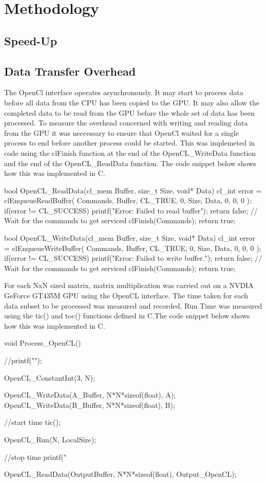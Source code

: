 \section{Methodology}

\subsection{Speed-Up}

\subsection{Data Transfer Overhead}
The OpenCl interface operates asynchronously. It may start to process data before all data from the CPU has been copied to the GPU. It may also allow the completed data to be read from the GPU before the whole set of data has been processed. To measure the overhead concerned with writing and reading data from the GPU it was neccessary to ensure that OpenCl waited for a single process to end before another process could be started. This was implemeted in code using the clFinish function at the end of the OpenCL\_WriteData function and the end of the OpenCL\_ReadData function. The code snippet below shows how this was implemented in C.

\begin{Cpp}
bool OpenCL_ReadData(cl_mem Buffer, size_t Size, void* Data){
	cl_int error = clEnqueueReadBuffer(
	Commands,
	Buffer,
	CL_TRUE,
	0,
	Size,
	Data,
	0, 0, 0
	);
	if(error != CL_SUCCESS){
		printf("Error: Failed to read buffer\n");
		return false;
	}
	// Wait for the commands to get serviced
	clFinish(Commands);
	return true;
}

bool OpenCL_WriteData(cl_mem Buffer, size_t Size, void* Data){
	cl_int error = clEnqueueWriteBuffer(
	Commands,
	Buffer,
	CL_TRUE,
	0,
	Size,
	Data,
	0, 0, 0
	);
	if(error != CL_SUCCESS){
		printf("Error: Failed to write buffer.\n");
		return false;
	}
	// Wait for the commands to get serviced
	clFinish(Commands);
	return true;
}
\end{Cpp}

For each NxN sized matrix, matrix multiplication was carried out on a NVDIA GeForce GT435M GPU using the OpenCL interface. The time taken for each data subset to be processed was measured and recorded. Run Time was measured using the tic() and toc() functions defined in C.The code snippet below shows how this was implemented in C.

\begin{Cpp}


void Process_OpenCL(){
	//printf("\n");
	
	OpenCL_ConstantInt(3, N);
	
	OpenCL_WriteData(A_Buffer, N*N*sizeof(float), A);
	OpenCL_WriteData(B_Buffer, N*N*sizeof(float), B);
	
	//start time
	tic();
	
	OpenCL_Run(N, LocalSize);
	
	//stop time
	printf("%
	
	OpenCL_ReadData(OutputBuffer, N*N*sizeof(float), Output_OpenCL);
}
		
\end{Cpp}

\vspace{-11mm}